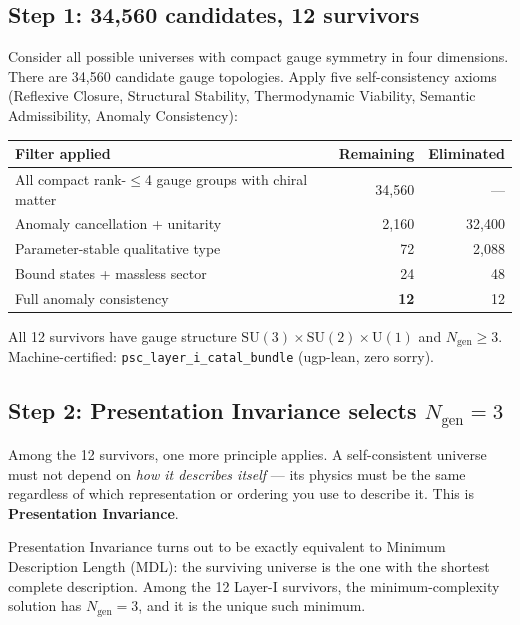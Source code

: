 \documentclass[11pt,a4paper]{article}
\newcommand{\term}[1]{\textbf{#1}}
\newcommand{\lean}[1]{\texttt{#1}}
\newcommand{\Ngen}{N_{\mathrm{gen}}}
\begin{document}
\subsection{Step 1: 34,560 candidates, 12 survivors}

Consider all possible universes with compact gauge symmetry in four
dimensions.  There are 34,560 candidate gauge topologies.  Apply five
self-consistency axioms (Reflexive Closure, Structural Stability,
Thermodynamic Viability, Semantic Admissibility, Anomaly Consistency):

\begin{center}
\small
\begin{tabular}{lrr}
\toprule
\textbf{Filter applied} & \textbf{Remaining} & \textbf{Eliminated} \\
\midrule
All compact rank-$\leq$4 gauge groups with chiral matter & 34,560 & --- \\
Anomaly cancellation + unitarity & 2,160 & 32,400 \\
Parameter-stable qualitative type & 72 & 2,088 \\
Bound states + massless sector & 24 & 48 \\
Full anomaly consistency & \textbf{12} & 12 \\
\bottomrule
\end{tabular}
\end{center}

\noindent
All 12 survivors have gauge structure
$\mathrm{SU}(3)\times\mathrm{SU}(2)\times\mathrm{U}(1)$ and $\Ngen \geq 3$.
Machine-certified: \lean{psc\_layer\_i\_catal\_bundle}
(ugp-lean, zero sorry).

\subsection{Step 2: Presentation Invariance selects $\Ngen = 3$}

Among the 12 survivors, one more principle applies.  A self-consistent
universe must not depend on \emph{how it describes itself} --- its physics
must be the same regardless of which representation or ordering you use to
describe it.  This is \term{Presentation Invariance}.

Presentation Invariance turns out to be exactly equivalent to Minimum
Description Length (MDL): the surviving universe is the one with the
shortest complete description.  Among the 12 Layer-I survivors, the
minimum-complexity solution has $\Ngen = 3$, and it is the unique such
minimum.
\end{document}
